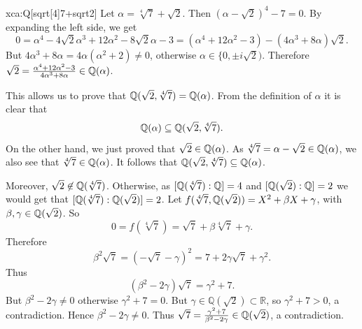 \begin{sol}{xca:Q[sqrt[4]{7}+sqrt{2}]}
Let $\alpha=\sqrt[4]{7}+\sqrt{2}$. Then $(\alpha - \sqrt{2})^4 -7 = 0$.
By expanding the left side, we get
\[
0  =\alpha^4 - 4\sqrt{2}\alpha^3 + 12 \alpha^2 - 8\sqrt{2}\alpha - 3 
 = (\alpha^4 + 12\alpha^2 - 3) -  (4 \alpha^3 + 8 \alpha )\sqrt{2}.
\]
But $4 \alpha^3 + 8 \alpha = 4\alpha (\alpha^2+2) \neq 0$, otherwise $\alpha\in\{0,\pm i\sqrt{2})$.
Therefore $\sqrt{2}=\frac{\alpha^4 + 12\alpha^2 - 3}{4 \alpha^3 + 8 \alpha}\in \mathbb{Q}(\alpha) $.

This allows us to prove that $\mathbb{Q}(\sqrt{2} , \sqrt[4]{7}) = \mathbb{Q}(\alpha)$.
From the definition of $\alpha$ it is clear that 
\[
\mathbb{Q}(\alpha) \subseteq \mathbb{Q}(\sqrt{2} , \sqrt[4]{7}).
\]
On the other hand, we just proved that $\sqrt{2} \in \mathbb{Q}(\alpha)$.
As $\sqrt[4]{7} = \alpha - \sqrt{2} \in \mathbb{Q}(\alpha)$,
we also see that $\sqrt[4]{7} \in \mathbb{Q}(\alpha)$.
It follows that $\mathbb{Q}(\sqrt{2} , \sqrt[4]{7}) \subseteq \mathbb{Q}(\alpha)$.

Moreover, $\sqrt{2}\not\in \mathbb{Q}(\sqrt[4]{7})$. 
Otherwise, as $[\mathbb{Q}(\sqrt[4]{7}):\mathbb{Q}] = 4$ and $[\mathbb{Q}(\sqrt{2}):\mathbb{Q}] = 2$
we would get that $[\mathbb{Q}(\sqrt[4]{7}):\mathbb{Q}(\sqrt{2})] = 2$.
Let $f(\sqrt[4]{7},\mathbb{Q}(\sqrt{2})) = X^2 + \beta X + \gamma$,
with $\beta, \gamma \in \mathbb{Q}(\sqrt{2})$. 
So 
$$0=f(\sqrt[4]{7})=\sqrt{7} + \beta \sqrt[4]{7} + \gamma.$$
Therefore 
$$\beta^2 \sqrt{7}  = (- \sqrt{7} - \gamma)^2 =7 + 2\gamma \sqrt{7}  + \gamma^2.$$
Thus 
\[
(\beta^2 - 2 \gamma)\sqrt{7}= \gamma^2 + 7.
\]
But $\beta^2 - 2 \gamma\neq 0$ 
otherwise
$\gamma^2+7=0$.
But $\gamma \in \mathbb{Q}(\sqrt{2}) \subset \mathbb{R}$, 
so $\gamma^2+7>0$, a contradiction.
Hence $\beta^2-2\gamma \neq 0$.
Thus 
$\sqrt{7} = \frac{\gamma^2 + 7}{\beta^2 - 2 \gamma} \in \mathbb{Q}(\sqrt{2})$, a contradiction.


\end{sol}
